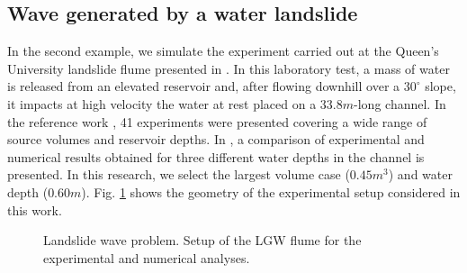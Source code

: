 
\subsection{Wave generated by a water landslide}
\label{Example2}

In the second example, we simulate the experiment carried out at the Queen's University landslide flume presented in \cite{bullard2019}. In this laboratory test, a mass of water is released from an elevated reservoir and, after flowing downhill over a $30^\circ$ slope, it impacts at high velocity the water at rest placed on a $33.8m$-long channel. 
In the reference work \cite{bullard2019}, 41 experiments were presented covering a wide range of source volumes and reservoir depths. In \cite{mulligan2020}, a comparison of experimental and numerical results obtained for three different water depths in the channel is presented. In this research, we select the largest volume case ($0.45m^3$) and water depth ($0.60m$). 
Fig. \ref{landslide_wave_channel} shows the geometry of the experimental setup considered in this work.



\begin{figure} [htb]
    \centering
    \caption{Landslide wave problem. Setup of the LGW flume for the experimental and numerical analyses.}
    \label{landslide_wave_channel}
\end{figure}



